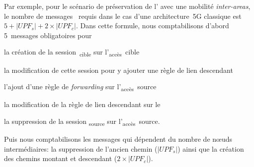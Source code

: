 \documentclass[../main.tex]{subfiles}
\begin{document}
Par exemple, pour le scénario de préservation de l’ avec une mobilité \textit{inter-areas}, le nombre de messages~ requis dans le cas d’une architecture~5G classique est $5 + |\mathit{UPF_s}| + 2 \times |\mathit{UPF_c}|$.
Dans cette formule, nous comptabilisons d’abord 5~messages obligatoires pour
\begin{enumerate*}[label=(P\arabic*), itemjoin={{, }}, itemjoin*={{, et }}]
    \item la création de la session~\textsubscript{cible} sur l’\textsubscript{accès}~cible
    \item la modification de cette session pour y ajouter une règle de lien descendant
    \item l’ajout d’une règle de \textit{forwarding} sur l’\textsubscript{accès}~source
    \item la modification de la règle de lien descendant sur le 
    \item la suppression de la session \textsubscript{source} sur l’\textsubscript{accès}~source.
\end{enumerate*}
Puis nous comptabilisons les messages qui dépendent du nombre de nœuds intermédiaires: la suppression de l’ancien chemin ($|\mathit{UPF_s}|$) ainsi que la création des chemins montant et descendant ($2 \times |\mathit{UPF_c}|$).
\end{document}
